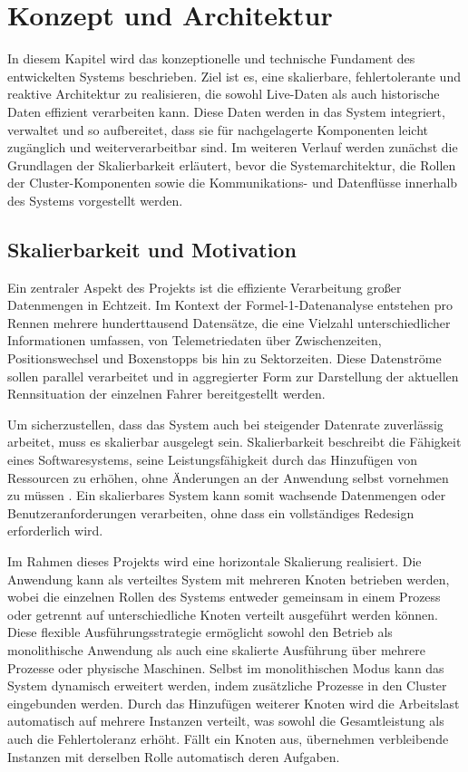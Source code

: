\chapter{Konzept und Architektur}

In diesem Kapitel wird das konzeptionelle und technische Fundament des entwickelten Systems beschrieben. 
Ziel ist es, eine skalierbare, fehlertolerante und reaktive Architektur zu realisieren, die sowohl Live-Daten 
als auch historische Daten effizient verarbeiten kann. Diese Daten werden in das System integriert, verwaltet 
und so aufbereitet, dass sie für nachgelagerte Komponenten leicht zugänglich und weiterverarbeitbar sind. 
Im weiteren Verlauf werden zunächst die Grundlagen der Skalierbarkeit erläutert, bevor die Systemarchitektur, 
die Rollen der Cluster-Komponenten sowie die Kommunikations- und Datenflüsse innerhalb des Systems vorgestellt 
werden.

\section{Skalierbarkeit und Motivation}

Ein zentraler Aspekt des Projekts ist die effiziente Verarbeitung großer Datenmengen in Echtzeit. 
Im Kontext der Formel-1-Datenanalyse entstehen pro Rennen mehrere hunderttausend Datensätze, 
die eine Vielzahl unterschiedlicher Informationen umfassen, von Telemetriedaten über Zwischenzeiten, 
Positionswechsel und Boxenstopps bis hin zu Sektorzeiten. Diese Datenströme sollen parallel verarbeitet 
und in aggregierter Form zur Darstellung der aktuellen Rennsituation der einzelnen Fahrer bereitgestellt werden.

Um sicherzustellen, dass das System auch bei steigender Datenrate zuverlässig arbeitet, muss es skalierbar ausgelegt sein. 
Skalierbarkeit beschreibt die Fähigkeit eines Softwaresystems, seine Leistungsfähigkeit durch das Hinzufügen von Ressourcen zu erhöhen, 
ohne Änderungen an der Anwendung selbst vornehmen zu müssen \parencite{bass2021}. Ein skalierbares System kann 
somit wachsende Datenmengen oder Benutzeranforderungen verarbeiten, ohne dass ein vollständiges Redesign erforderlich wird.

Im Rahmen dieses Projekts wird eine horizontale Skalierung realisiert. 
Die Anwendung kann als verteiltes System mit mehreren Knoten betrieben werden, 
wobei die einzelnen Rollen des Systems entweder gemeinsam in einem Prozess oder getrennt auf unterschiedliche 
Knoten verteilt ausgeführt werden können. Diese flexible Ausführungsstrategie ermöglicht sowohl den Betrieb 
als monolithische Anwendung als auch eine skalierte Ausführung über mehrere Prozesse oder physische Maschinen. 
Selbst im monolithischen Modus kann das System dynamisch erweitert werden, indem zusätzliche Prozesse 
in den Cluster eingebunden werden. Durch das Hinzufügen weiterer Knoten wird die Arbeitslast automatisch auf 
mehrere Instanzen verteilt, was sowohl die Gesamtleistung als auch die Fehlertoleranz erhöht. 
Fällt ein Knoten aus, übernehmen verbleibende Instanzen mit derselben Rolle automatisch deren Aufgaben.

